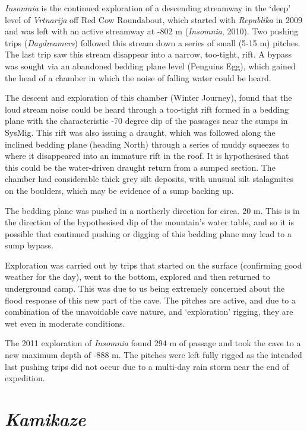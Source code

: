\emph{Insomnia} is the continued exploration of a descending streamway
in the `deep' level of \emph{Vrtnarija} off Red Cow Roundabout, which
started with \emph{Republika} in 2009 and was left with an active
streamway at -802 m (\emph{Insomnia}, 2010). Two pushing trips
(\emph{Daydreamers}) followed this stream down a series of small (5-15
m) pitches. The last trip saw this stream disappear into a narrow,
too-tight, rift. A bypass was sought via an abandoned bedding plane
level (Penguins Egg), which gained the head of a chamber in which the
noise of falling water could be heard.

The descent and exploration of this chamber (Winter Journey), found that
the loud stream noise could be heard through a too-tight rift formed in
a bedding plane with the characteristic -70 degree dip of the passages
near the sumps in SysMig. This rift was also issuing a draught, which
was followed along the inclined bedding plane (heading North) through a
series of muddy squeezes to where it disappeared into an immature rift
in the roof. It is hypothesised that this could be the water-driven
draught return from a sumped section. The chamber had considerable thick
grey silt deposits, with unusual silt stalagmites on the boulders, which
may be evidence of a sump backing up.

The bedding plane was pushed in a northerly direction for circa. 20 m.
This is in the direction of the hypothesised dip of the mountain's water
table, and so it is possible that continued pushing or digging of this
bedding plane may lead to a sump bypass.

Exploration was carried out by trips that started on the surface
(confirming good weather for the day), went to the bottom, explored and
then returned to underground camp. This was due to us being extremely
concerned about the flood response of this new part of the cave. The
pitches are active, and due to a combination of the unavoidable cave
nature, and `exploration' rigging, they are wet even in moderate
conditions.

The 2011 exploration of \emph{Insomnia} found 294 m of passage and took
the cave to a new maximum depth of -888 m. The pitches were left fully
rigged as the intended last pushing trips did not occur due to a
multi-day rain storm near the end of expedition.

\hypertarget{kamikaze}{%
\section{\texorpdfstring{\emph{Kamikaze}}{Kamikaze}}\label{kamikaze}}

